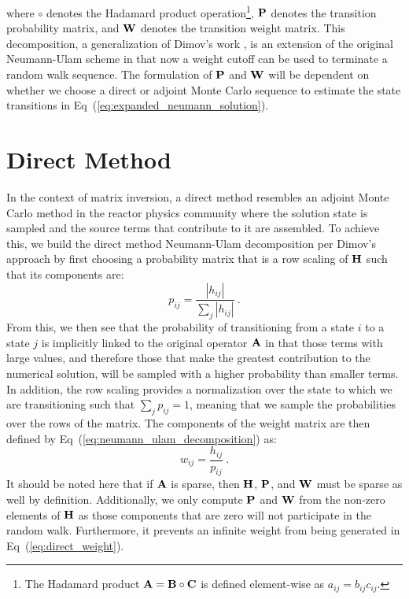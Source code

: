 where $\circ$ denotes the Hadamard product operation\footnote{The
  Hadamard product $\mathbf{A} = \mathbf{B} \circ \mathbf{C}$ is defined
  element-wise as $a_{ij} = b_{ij} c_{ij}$.}, $\mathbf{P}$ denotes the
transition probability matrix, and $\mathbf{W}$ denotes the transition
weight matrix. This decomposition, a generalization of Dimov's work
\citep{dimov_new_1998}, is an extension of the original Neumann-Ulam
scheme in that now a weight cutoff can be used to terminate a random
walk sequence. The formulation of $\mathbf{P}$ and $\mathbf{W}$ will be
dependent on whether we choose a direct or adjoint Monte Carlo
sequence to estimate the state transitions in
Eq~(\ref{eq:expanded_neumann_solution}).

\section{Direct Method}
\label{sec:direct_mc}
In the context of matrix inversion, a direct method resembles an
adjoint Monte Carlo method in the reactor physics community where the
solution state is sampled and the source terms that contribute to it
are assembled. To achieve this, we build the direct method
Neumann-Ulam decomposition per Dimov's approach by first choosing a
probability matrix that is a row scaling of $\mathbf{H}$ such that its
components are:
\begin{equation}
  p_{ij} = \frac{|h_{ij}|}{\sum_j |h_{ij}|}\:.
  \label{eq:direct_probability}
\end{equation}
From this, we then see that the probability of transitioning from a
state $i$ to a state $j$ is implicitly linked to the original operator
$\mathbf{A}$ in that those terms with large values, and therefore those
that make the greatest contribution to the numerical solution, will be
sampled with a higher probability than smaller terms. In addition, the
row scaling provides a normalization over the state to which we are
transitioning such that $\sum_j p_{ij} = 1$, meaning that we sample
the probabilities over the rows of the matrix. The components of
the weight matrix are then defined by
Eq~(\ref{eq:neumann_ulam_decomposition}) as:
\begin{equation}
  w_{ij} = \frac{h_{ij}}{p_{ij}}\:.
  \label{eq:direct_weight}
\end{equation}
It should be noted here that if $\mathbf{A}$ is sparse, then $\mathbf{H}$,
$\mathbf{P}$, and $\mathbf{W}$ must be sparse as well by
definition. Additionally, we only compute $\mathbf{P}$ and $\mathbf{W}$ from
the non-zero elements of $\mathbf{H}$ as those components that are zero
will not participate in the random walk. Furthermore, it prevents an
infinite weight from being generated in Eq~(\ref{eq:direct_weight}).

